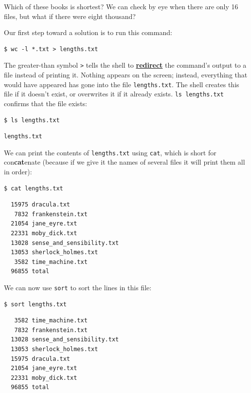 \documentclass[
]{krantz}
\newcommand{\gref}[2]{\hyperlink{#2}{\textbf{#1}}}
\begin{document}
Which of these books is shortest?
We can check by eye when there are only 16 files,
but what if there were eight thousand?

Our first step toward a solution is to run this command:

\begin{verbatim}
$ wc -l *.txt > lengths.txt
\end{verbatim}

The greater-than symbol \texttt{\textgreater{}} tells the shell
to \gref{redirect}{redirection} the command's output to a file instead of printing it.
Nothing appears on the screen;
instead,
everything that would have appeared has gone into the file \texttt{lengths.txt}.
The shell creates this file if it doesn't exist,
or overwrites it if it already exists.
\texttt{ls\ lengths.txt} confirms that the file exists:

\begin{verbatim}
$ ls lengths.txt
\end{verbatim}

\begin{verbatim}
lengths.txt
\end{verbatim}

We can print the contents of \texttt{lengths.txt} using \texttt{cat},
which is short for con\textbf{cat}enate
(because if we give it the names of several files
it will print them all in order):

\begin{verbatim}
$ cat lengths.txt
\end{verbatim}

\begin{verbatim}
  15975 dracula.txt
   7832 frankenstein.txt
  21054 jane_eyre.txt
  22331 moby_dick.txt
  13028 sense_and_sensibility.txt
  13053 sherlock_holmes.txt
   3582 time_machine.txt
  96855 total
\end{verbatim}

We can now use \texttt{sort} to sort the lines in this file:

\begin{verbatim}
$ sort lengths.txt
\end{verbatim}

\begin{verbatim}
   3582 time_machine.txt
   7832 frankenstein.txt
  13028 sense_and_sensibility.txt
  13053 sherlock_holmes.txt
  15975 dracula.txt
  21054 jane_eyre.txt
  22331 moby_dick.txt
  96855 total
\end{verbatim}
\end{document}
